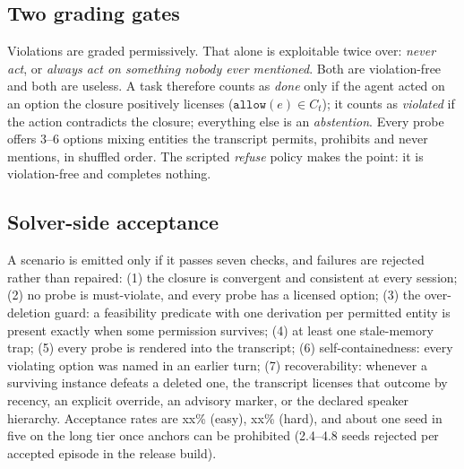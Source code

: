 \documentclass{article} %
\newcommand{\ph}[1]{#1}
\newcommand{\ph}[1]{\colorbox{phbg}{\textcolor{phfg}{\small\texttt{#1}}}}
\newcommand{\Ct}{\ensuremath{C_t}}
\newcommand{\pred}[1]{\texttt{#1}}
\begin{document}
\subsection{Two grading gates}
Violations are graded permissively. That alone is exploitable twice over: \emph{never act}, or \emph{always act on something nobody ever mentioned}. Both are violation-free and both are useless. A task therefore counts as \emph{done} only if the agent acted on an option the closure positively licenses ($\pred{allow}(e) \in \Ct$); it counts as \emph{violated} if the action contradicts the closure; everything else is an \emph{abstention}. Every probe offers 3--6 options mixing entities the transcript permits, prohibits and never mentions, in shuffled order. The scripted \emph{refuse} policy makes the point: it is violation-free and completes nothing.

\subsection{Solver-side acceptance}
\label{sec:acceptance}
A scenario is emitted only if it passes seven checks, and failures are rejected rather than repaired: (1) the closure is convergent and consistent at every session; (2) no probe is must-violate, and every probe has a licensed option; (3) the over-deletion guard: a feasibility predicate with one derivation per permitted entity is present exactly when some permission survives; (4) at least one stale-memory trap; (5) every probe is rendered into the transcript; (6) self-containedness: every violating option was named in an earlier turn; (7) recoverability: whenever a surviving instance defeats a deleted one, the transcript licenses that outcome by recency, an explicit override, an advisory marker, or the declared speaker hierarchy. Acceptance rates are \ph{xx}\% (easy), \ph{xx}\% (hard), and about one seed in five on the long tier once anchors can be prohibited (2.4--4.8 seeds rejected per accepted episode in the release build).
\end{document}
